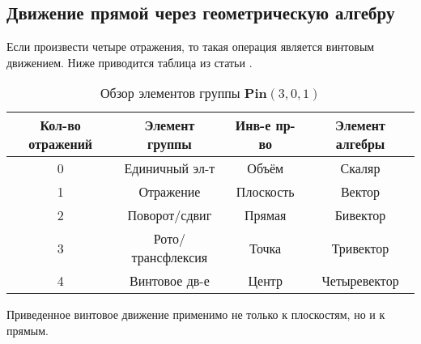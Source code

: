   \subsection{Движение прямой через геометрическую алгебру}
  Если произвести четыре отражения, то такая операция является винтовым движением. Ниже приводится таблица из статьи 
  \autocite{ruheGeometricCliffordAlgebra2023}. 

  \begin{table}[h!]
    \centering
    \caption{Обзор элементов группы $\mathbf{Pin}(3,0,1)$}
    \label{tab:example}
    \begin{tabular}{|c|c|c|c|} %
    \hline
    \textbf{Кол-во отражений} & \textbf{Элемент группы} & \textbf{Инв-е пр-во} & \textbf{Элемент алгебры} \\ \hline
    0 & Единичный эл-т & Объём & Скаляр \\ \hline
    1 & Отражение & Плоскость & Вектор \\ \hline
    2 & Поворот/сдвиг & Прямая & Бивектор \\ \hline
    3 & Рото/трансфлексия & Точка & Тривектор \\ \hline
    4 & Винтовое дв-е & Центр & Четыревектор \\ \hline

    \end{tabular}
  \end{table}

  Приведенное винтовое движение применимо не только к плоскостям, но и к прямым. 


  


